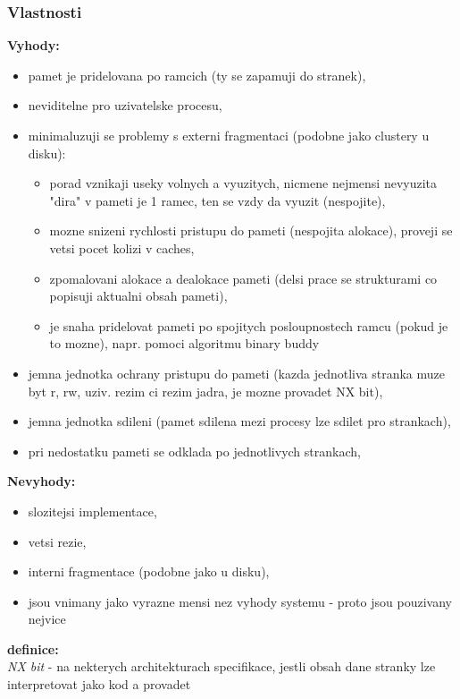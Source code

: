 \documentclass[a4paper, 11pt]{article}
\begin{document}
\subsubsection{Vlastnosti}
\textbf{Vyhody:}
\begin{itemize}
    \item pamet je pridelovana po ramcich (ty se zapamuji do stranek),
    \item neviditelne pro uzivatelske procesu,
    \item minimaluzuji se problemy s externi fragmentaci (podobne jako clustery u disku):
    \begin{itemize}
        \item porad vznikaji useky volnych a vyuzitych, nicmene nejmensi nevyuzita "dira" v pameti je 1 ramec, ten se vzdy da vyuzit (nespojite),
        \item mozne snizeni rychlosti pristupu do pameti (nespojita alokace), proveji se vetsi pocet kolizi v caches,
        \item zpomalovani alokace a dealokace pameti (delsi prace se strukturami co popisuji aktualni obsah pameti),
        \item je snaha pridelovat pameti po spojitych posloupnostech ramcu (pokud je to mozne), napr. pomoci algoritmu binary buddy
    \end{itemize}
    \item jemna jednotka ochrany pristupu do pameti (kazda jednotliva stranka muze byt r, rw, uziv. rezim ci rezim jadra, je mozne provadet NX bit),
    \item jemna jednotka sdileni (pamet sdilena mezi procesy lze sdilet pro strankach),
    \item pri nedostatku pameti se odklada po jednotlivych strankach, \\
\end{itemize}

\textbf{Nevyhody:}
\begin{itemize}
    \item slozitejsi implementace,
    \item vetsi rezie,
    \item interni fragmentace (podobne jako u disku),
    \item jsou vnimany jako vyrazne mensi nez vyhody systemu - proto jsou pouzivany nejvice \\
\end{itemize}

\textbf{definice:} \\[0.5em]
\textit{NX bit} - na nekterych architekturach specifikace, jestli obsah dane stranky lze interpretovat jako kod a provadet
\end{document}
